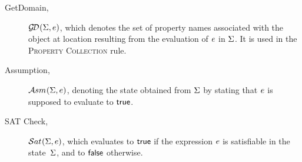 \begin{description}
               
             
  \item[GetDomain,] $\mathcal{G\!D}_{}(\Sigma, e)$, which denotes the 
           set of property names associated with the object at location resulting from the evaluation of $e$ 
           in $\Sigma$. It is used in the \textsc{Property Collection} rule.
   
   
   \item[Assumption,] $\mathcal{A}{sm}_{}(\Sigma, e)$, denoting the state obtained from $\Sigma$ by stating that $e$ is supposed to evaluate to ${\sf true}$. 
  
   \item[SAT Check,] $\mathcal{S}at_{}(\Sigma, e)$, which evaluates to ${\sf true}$ if the \jsil expression $e$ is satisfiable in the state~$\Sigma$, and to ${\sf false}$ otherwise.
             
\end{description}

